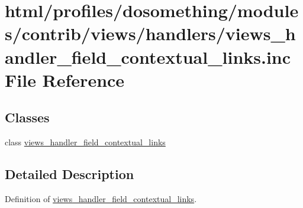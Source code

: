 \hypertarget{views__handler__field__contextual__links_8inc}{
\section{html/profiles/dosomething/modules/contrib/views/handlers/views\_\-handler\_\-field\_\-contextual\_\-links.inc File Reference}
\label{views__handler__field__contextual__links_8inc}
}
\subsection*{Classes}
\begin{DoxyCompactItemize}
\item 
class \hyperlink{classviews__handler__field__contextual__links}{views\_\-handler\_\-field\_\-contextual\_\-links}
\end{DoxyCompactItemize}


\subsection{Detailed Description}
Definition of \hyperlink{classviews__handler__field__contextual__links}{views\_\-handler\_\-field\_\-contextual\_\-links}. 